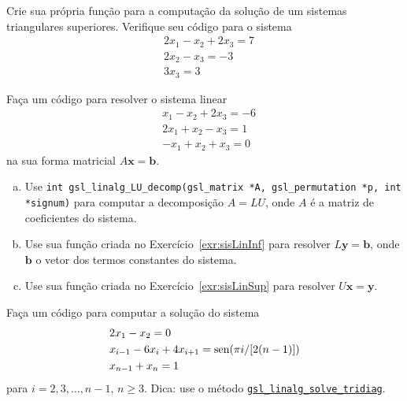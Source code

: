 \documentclass[12pt]{article}
\begin{document}
\begin{exr}\label{exr:sisLinSup}
  Crie sua própria função para a computação da solução de um sistemas triangulares superiores. Verifique seu código para o sistema
  \begin{equation}
    \begin{aligned}
      &2x_1 - x_2 + 2x_3 = 7\\
      &2x_2 - x_3 = -3\\
      &3x_3 = 3
    \end{aligned}
  \end{equation}
\end{exr}

\begin{exr}
  Faça um código para resolver o sistema linear
  \begin{equation}
    \begin{aligned}
      &x_1 - x_2 + 2x_3 = -6\\
      &2x_1 + x_2 - x_3 = 1\\
      &-x_1 + x_2 + x_3 = 0
    \end{aligned}
  \end{equation}
  na sua forma matricial $A\pmb{x} = \pmb{b}$.
  \begin{enumerate}[a)]
  \item Use \lstinline+int gsl_linalg_LU_decomp(gsl_matrix *A, gsl_permutation *p, int *signum)+ para computar a decomposição $A = LU$, onde $A$ é a matriz de coeficientes do sistema.
  \item Use sua função criada no Exercício~\ref{exr:sisLinInf} para resolver $L\pmb{y} = \pmb{b}$, onde $\pmb{b}$ o vetor dos termos constantes do sistema.
  \item Use sua função criada no Exercício~\ref{exr:sisLinSup} para resolver $U\pmb{x} = \pmb{y}$.
  \end{enumerate}
\end{exr}

\begin{exr}
  Faça um código para computar a solução do sistema
  \begin{equation}
    \begin{aligned}
      &2x_1 - x_2 = 0\\
      &x_{i-1} - 6x_i + 4x_{i+1} = \operatorname{sen}(\pi i/[2(n-1)])\\
      &x_{n-1} + x_n = 1
    \end{aligned}
  \end{equation}
  para $i= 2, 3, \dotsc, n-1$, $n\geq 3$. Dica: use o método \href{https://www.gnu.org/software/gsl/doc/html/linalg.html#c.gsl_linalg_solve_tridiag}{\lstinline!gsl_linalg_solve_tridiag!}.
\end{exr}
\end{document}
